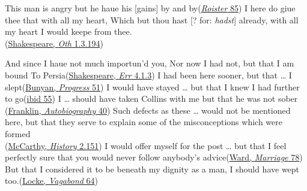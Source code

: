 \ea \label{ex:12-132a}
\ea
This man is angry but he haue his [gains] by and by\hfill(\href{https://archive.org/details/roisterdoister00udalgoog/page/n90/mode/2up?view=theater&q=%22This+man+is+angry%22}{\textit{Roister} 85})
\ex
I here do giue thee that with all my heart, Which but thou hast [? for: \textit{hadst}] already, with all my heart I would keepe from thee.\\\hfill(\href{https://internetshakespeare.uvic.ca/doc/Oth_F1/scene/1.3/index.html#tln-540}{Shakespeare, \textit{Oth} 1.3.194}) %
\z
\z

\ea \label{ex:12-132b}
\ea
And since I haue not much importun'd you, Nor now I had not, but that I am bound To Persia\hfill(\href{https://internetshakespeare.uvic.ca/doc/Err_F1/scene/4.1/index.html#tln-980}{Shakespeare, \textit{Err} 4.1.3})
\ex
I had been here sooner, but that {\dots} I slept\hfill(\href{https://archive.org/details/bunyanspilgrims00moffgoog/page/60/mode/2up?q=%22had+been+here%22&view=theater}{Bunyan, \textit{Progress} 51}) %
\ex
I would have stayed {\dots} but that I knew I had further to go\hfill(\href{https://archive.org/details/bunyanspilgrims00moffgoog/page/64/mode/2up?q=%22had+further+to+go%22&view=theater}{ibid 55}) %
\ex
I {\dots} should have taken Collins with me but that he was not sober\\\hfill(\href{https://archive.org/details/benjaminfrautobio00franrich/page/124/mode/2up?q=%22should+have+taken+collins%22&view=theater}{Franklin, \textit{Autobiography} 40})
\ex
Such defects as these {\dots} would not be mentioned here, but that they serve to explain some of the misconceptions which were formed\\\hfill(\href{https://books.google.co.jp/books?id=dGXXEAAAQBAJ&pg=PA151&lpg=PA151&dq=%22would+not+be+mentioned+here%22+mccarthy&source=bl&ots=25UTYMjUWc&sig=ACfU3U1xipQlMVEVVB8arBCswAOn9jm7vg&hl=en&sa=X&ved=2ahUKEwiq8-mUlImGAxXcr1YBHRaODQsQ6AF6BAgFEAM#v=onepage&q=%22would%20not%20be%20mentioned%20here%22%20mccarthy&f=false}{McCarthy, \textit{History} 2.151}) %
\ex
I would offer myself for the post {\dots} but that I feel perfectly sure that you would never follow anybody's advice\hfill(\href{https://archive.org/details/marriageofwillia0000mrsh_i0u5/page/86/mode/2up?q=%22would+offer+myself%22&view=theater}{Ward, \textit{Marriage} 78}) %
\ex
But that I considered it to be beneath my dignity as a man, I should have wept too.\hfill(\href{https://archive.org/details/belovdvagabond05lockgoog/page/n68/mode/2up?q=%22but+that+I+considered%22&view=theater}{Locke, \textit{Vagabond} 64})
\z
\z

